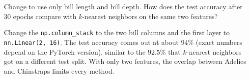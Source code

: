 \begin{Exercise}[label=nnc5, title={Two features only}]
Change  to use only bill length and bill depth. How does the test accuracy after 30 epochs
compare with $k$-nearest neighbors on the same two features?
\end{Exercise}
\begin{Answer}[ref=nnc5]
Change the \verb|np.column_stack| to the two bill columns and the first layer to \verb|nn.Linear(2, 16)|. The test
accuracy comes out at about 94\% (exact numbers depend on the PyTorch version), similar to the 92.5\% that
$k$-nearest neighbors got on a different test split. With only two features, the overlap between Adelies and
Chinstraps limits every method.
\end{Answer}
